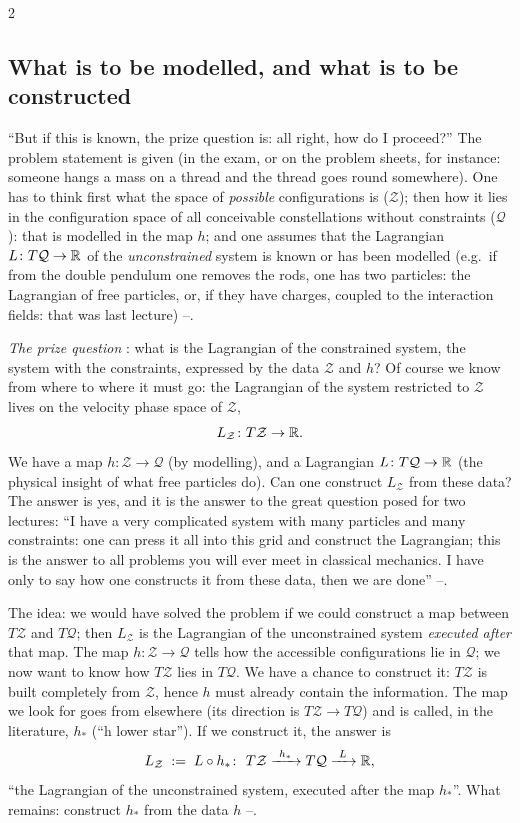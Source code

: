 \begin{paracol}{2}
\subsection{What is to be modelled, and what is to be constructed}\label{ssec:zw-model}

``But if this is known, the prize question is: all right, how do I proceed?'' The problem statement is given (in the exam, or on the problem sheets, for instance: someone hangs a mass on a thread and the thread goes round somewhere). One has to think first what the space of \emph{possible} configurations is ($\mathcal Z$); then how it lies in the configuration space of all conceivable constellations without constraints ($\mathcal Q$): that is modelled in the map $h$; and one assumes that the Lagrangian $L\colon T\mathcal Q\to\mathbb{R}$ of the \emph{unconstrained} system is known or has been modelled (e.g.\ if from the double pendulum one removes the rods, one has two particles: the Lagrangian of free particles, or, if they have charges, coupled to the interaction fields: that was last lecture) --.

\emph{The prize question} : what is the Lagrangian of the constrained system, the system with the constraints, expressed by the data $\mathcal Z$ and $h$? Of course we know from where to where it must go: the Lagrangian of the system restricted to $\mathcal Z$ lives on the velocity phase space of $\mathcal Z$,
\[
  L_{\mathcal Z}\colon T\mathcal Z\to\mathbb{R} .
\]
We have a map $h\colon\mathcal Z\to\mathcal Q$ (by modelling), and a Lagrangian $L\colon T\mathcal Q\to\mathbb{R}$ (the physical insight of what free particles do). Can one construct $L_{\mathcal Z}$ from these data? The answer is yes, and it is the answer to the great question posed for two lectures: ``I have a very complicated system with many particles and many constraints: one can press it all into this grid and construct the Lagrangian; this is the answer to all problems you will ever meet in classical mechanics. I have only to say how one constructs it from these data, then we are done'' --.

The idea: we would have solved the problem if we could construct a map between $T\mathcal Z$ and $T\mathcal Q$; then $L_{\mathcal Z}$ is the Lagrangian of the unconstrained system \emph{executed after} that map. The map $h\colon\mathcal Z\to\mathcal Q$ tells how the accessible configurations lie in $\mathcal Q$; we now want to know how $T\mathcal Z$ lies in $T\mathcal Q$. We have a chance to construct it: $T\mathcal Z$ is built completely from $\mathcal Z$, hence $h$ must already contain the information. The map we look for goes from elsewhere (its direction is $T\mathcal Z\to T\mathcal Q$) and is called, in the literature, $h_*$ (``h lower star''). If we construct it, the answer is
\begin{equation}\label{eq:zw-LZ}
  L_{\mathcal Z}\;:=\;L\circ h_*\colon\ T\mathcal Z\xrightarrow{\ h_*\ }T\mathcal Q\xrightarrow{\ L\ }\R ,
\end{equation}
``the Lagrangian of the unconstrained system, executed after the map $h_*$''. What remains: construct $h_*$ from the data $h$ --.


\end{paracol}
